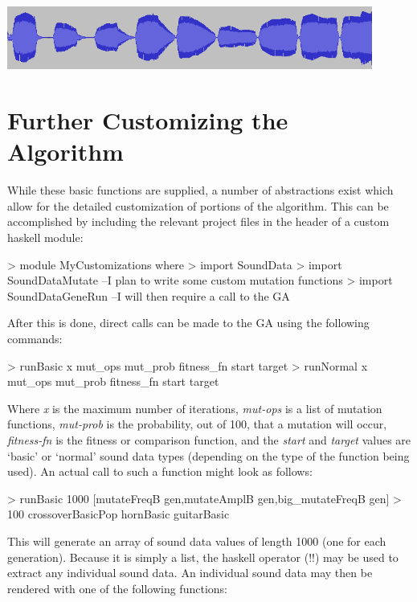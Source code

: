 \documentclass[11pt]{article}
\begin{document}
\includegraphics[width=120mm]{normal_wav.png}

\section{Further Customizing the Algorithm}

While these basic functions are supplied, a number of abstractions exist which allow for the detailed customization of portions of the algorithm. This can be accomplished by including the relevant project files in the header of a custom haskell module:

\begin{code}
> module MyCustomizations where
> import SoundData
> import SoundDataMutate --I plan to write some custom mutation functions
> import SoundDataGeneRun --I will then require a call to the GA
\end{code}

After this is done, direct calls can be made to the GA using the following commands:

\begin{code}
> runBasic  x mut_ops mut_prob fitness_fn start target
> runNormal x mut_ops mut_prob fitness_fn start target
\end{code}

Where \emph{x} is the maximum number of iterations, \emph{mut-ops} is a list of mutation functions, \emph{mut-prob} is the probability, out of 100, that a mutation will occur, \emph{fitness-fn} is the fitness or comparison function, and the \emph{start} and \emph{target} values are `basic' or `normal' sound data types (depending on the type of the function being used). An actual call to such a function might look as follows:

\begin{code}
> runBasic 1000 [mutateFreqB gen,mutateAmplB gen,big_mutateFreqB gen]
>            100 crossoverBasicPop hornBasic guitarBasic
\end{code}

This will generate an array of sound data values of length 1000 (one for each generation). Because it is simply a list, the haskell operator (!!) may be used to extract any individual sound data. An individual sound data may then be rendered with one of the following functions:
\end{document}
